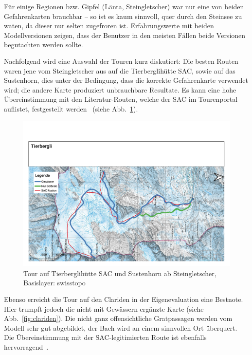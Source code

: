 Für einige Regionen bzw. Gipfel (Länta, Steingletscher) war nur eine von beiden Gefahrenkarten brauchbar -- so ist es kaum sinnvoll, quer durch den Steinsee zu waten, da dieser nur selten zugefroren ist. Erfahrungswerte mit beiden Modellversionen zeigen, dass der Benutzer in den meisten Fällen beide Versionen begutachten werden sollte.

Nachfolgend wird eine Auswahl der Touren kurz diskutiert: Die besten Routen waren jene vom Steingletscher aus auf die Tierberglihütte SAC, sowie auf das Sustenhorn, dies unter der Bedingung, dass die korrekte Gefahrenkarte verwendet wird; die andere Karte produziert unbrauchbare Resultate. Es kann eine hohe Übereinstimmung mit den Literatur-Routen, welche der SAC im Tourenportal auflistet, festgestellt werden~\cite{mmzentralch} (siehe Abb.\ \ref{fig:tierbergli}).
\begin{figure}[ht]
  \centering
  \includegraphics[page=1,width=.9\linewidth]{./../evaluation/PDFs/Tierbergli.pdf}
  \caption{Tour auf Tierberglihütte SAC und Sustenhorn ab Steingletscher, \\Basislayer: swisstopo}\label{fig:tierbergli}
\end{figure}


Ebenso erreicht die Tour auf den Clariden in der Eigenevaluation eine Bestnote. Hier trumpft jedoch die nicht mit Gewässern ergänzte Karte (siehe Abb.\ \ref{fig:clariden}). Die nicht ganz offensichtliche Gratpassagen werden vom Modell sehr gut abgebildet, der Bach wird an einem sinnvollen Ort überquert. Die Übereinstimmung mit der SAC-legitimierten Route ist ebenfalls hervorragend~\cite{twslstgallappzll}.

